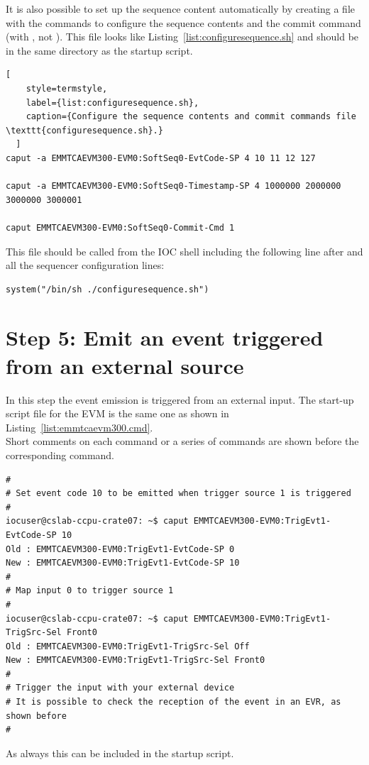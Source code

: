 \documentclass[11pt
  , a4paper
  , article
  , oneside
  , showtrims
]{memoir}
\begin{document}
It is also possible to set up the sequence content automatically by creating a file with the commands to configure the sequence contents and the commit command (with , not ). This file looks like Listing~\ref{list:configuresequence.sh} and should be in the same directory as the startup script.
\begin{lstlisting}[
    style=termstyle,
    label={list:configuresequence.sh},
    caption={Configure the sequence contents and commit commands file \texttt{configuresequence.sh}.}
  ]
caput -a EMMTCAEVM300-EVM0:SoftSeq0-EvtCode-SP 4 10 11 12 127

caput -a EMMTCAEVM300-EVM0:SoftSeq0-Timestamp-SP 4 1000000 2000000 3000000 3000001

caput EMMTCAEVM300-EVM0:SoftSeq0-Commit-Cmd 1
\end{lstlisting}

This file should be called from the IOC shell including the following line after  and all the sequencer configuration lines:
\begin{lstlisting}
system("/bin/sh ./configuresequence.sh")
\end{lstlisting}

\section{Step 5: Emit an event triggered from an external source}
In this step the event emission is triggered from an external input. The start-up script file for the EVM is the same one as shown in Listing~\ref{list:emmtcaevm300.cmd}.\\

Short comments on each command or a series of commands are shown before the corresponding command.
\begin{lstlisting}[style=termstyle]
#
# Set event code 10 to be emitted when trigger source 1 is triggered
#
iocuser@cslab-ccpu-crate07: ~$ caput EMMTCAEVM300-EVM0:TrigEvt1-EvtCode-SP 10
Old : EMMTCAEVM300-EVM0:TrigEvt1-EvtCode-SP 0
New : EMMTCAEVM300-EVM0:TrigEvt1-EvtCode-SP 10
#
# Map input 0 to trigger source 1
#
iocuser@cslab-ccpu-crate07: ~$ caput EMMTCAEVM300-EVM0:TrigEvt1-TrigSrc-Sel Front0
Old : EMMTCAEVM300-EVM0:TrigEvt1-TrigSrc-Sel Off
New : EMMTCAEVM300-EVM0:TrigEvt1-TrigSrc-Sel Front0
#
# Trigger the input with your external device
# It is possible to check the reception of the event in an EVR, as shown before
#
\end{lstlisting}
As always this can be included in the startup script.\\
\end{document}
